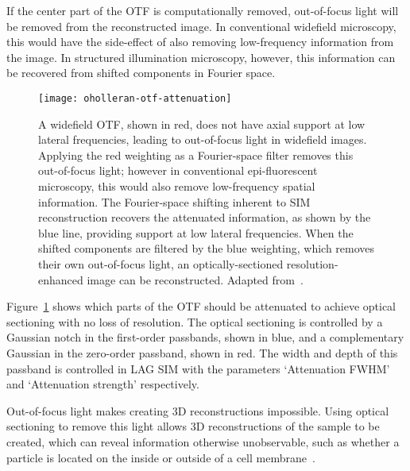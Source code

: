 If the center part of the OTF is computationally removed, out-of-focus light will be removed from the reconstructed image.
In conventional widefield microscopy, this would have the side-effect of also removing low-frequency information from the image. 
In structured illumination microscopy, however, this information can be recovered from shifted components in Fourier space. 

\begin{figure}[htbp!]
\centering
\texttt{[image: oholleran-otf-attenuation]}
\caption[LAG SIM: OTF attenuation as part of the SIM reconstruction process removes out of focus light]{A widefield OTF, shown in red, does not have axial support at low lateral frequencies, leading to out-of-focus light in widefield images. Applying the red weighting as a Fourier-space filter removes this out-of-focus light; however in conventional epi-fluorescent microscopy, this would also remove low-frequency spatial information. The Fourier-space shifting inherent to SIM reconstruction recovers the attenuated information, as shown by the blue line, providing support at low lateral frequencies. When the shifted components are filtered by the blue weighting, which removes their own out-of-focus light, an optically-sectioned resolution-enhanced image can be reconstructed.  Adapted from~\cite{oholleran2014optimized}. }
\label{fig:oholleran-otf}
\end{figure}

Figure~\ref{fig:oholleran-otf} shows which parts of the OTF should be attenuated to achieve optical sectioning with no loss of resolution. 
The optical sectioning is controlled by a Gaussian notch in the first-order passbands, shown in blue, and a complementary Gaussian in the zero-order passband, shown in red. 
The width and depth of this passband is controlled in LAG SIM with the parameters `Attenuation FWHM' and `Attenuation strength' respectively.


Out-of-focus light makes creating 3D reconstructions impossible. %
Using optical sectioning to remove this light allows 3D reconstructions of the sample to be created, which can reveal information otherwise unobservable, such as whether a particle is located on the inside or outside of a cell membrane~\cite{teplensky2017temperature}. 

